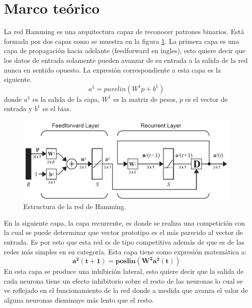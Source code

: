 \documentclass[12pt, titlepage]{article}
\begin{document}
    \section{Marco teórico}
    La red Hamming es una arquitectura capaz de reconocer patrones binarios. Está formada por dos capas como se muestra en la figura \ref{fig:hamming-diagrama}. La primera capa es una capa de propagación hacia adelante (feedforward en ingles), esto quiere decir que los datos de entrada solamente pueden avanzar de su entrada a la salida de la red nunca en sentido opuesto. \cite{hammi}
    La expresión correspondiente a esta capa es la siguiente.
    \[ a^1=purelin(W^1p+b^1) \]
    donde $a^1$ es la salida de la capa, $W^1$ es la matriz de pesos, $p$ es el vector de entrada y $b^1$ es el bias.
    \begin{figure}[H]
        \begin{center}
            \includegraphics[width=16cm]{img/hamming/diagrama.png}
            \caption{Estructura de la red de Hamming. \cite{libro1}}
            \label{fig:hamming-diagrama}
        \end{center}
    \end{figure}
    En la siguiente capa, la capa recurrente, es donde se realiza una competición con la cual se puede determinar que vector prototipo es el más parecido al vector de entrada.\cite{libro1}
    Es por esto que esta red es de tipo competitiva además de que es de las redes más simples en su categoría.
    Esta capa tiene como expresión matemática a:
    \[\boldsymbol{a^2(t+1) = poslin(W^2a^2(t))}\]
    En esta capa se produce una inhibición lateral, esto quiere decir que la salida de cada neurona tiene un efecto inhibitorio sobre el resto de las neuronas lo cual se ve reflejado en el funcionamiento de la red donde a medida que avanza el valor de alguna neuronas disminuye más lento que el resto. \cite{libro1} 
    
\end{document}
